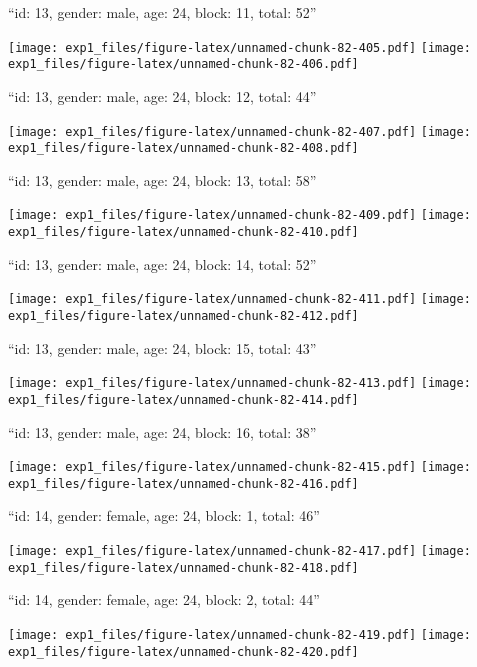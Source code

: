 \documentclass[11pt,,]{article}
\begin{document}
\newpage
[1] 

``id: 13, gender: male, age: 24, block: 11, total: 52''

\texttt{[image: exp1\_files/figure-latex/unnamed-chunk-82-405.pdf]}
\texttt{[image: exp1\_files/figure-latex/unnamed-chunk-82-406.pdf]}

\newpage
[1] 

``id: 13, gender: male, age: 24, block: 12, total: 44''

\texttt{[image: exp1\_files/figure-latex/unnamed-chunk-82-407.pdf]}
\texttt{[image: exp1\_files/figure-latex/unnamed-chunk-82-408.pdf]}

\newpage
[1] 

``id: 13, gender: male, age: 24, block: 13, total: 58''

\texttt{[image: exp1\_files/figure-latex/unnamed-chunk-82-409.pdf]}
\texttt{[image: exp1\_files/figure-latex/unnamed-chunk-82-410.pdf]}

\newpage
[1] 

``id: 13, gender: male, age: 24, block: 14, total: 52''

\texttt{[image: exp1\_files/figure-latex/unnamed-chunk-82-411.pdf]}
\texttt{[image: exp1\_files/figure-latex/unnamed-chunk-82-412.pdf]}

\newpage
[1] 

``id: 13, gender: male, age: 24, block: 15, total: 43''

\texttt{[image: exp1\_files/figure-latex/unnamed-chunk-82-413.pdf]}
\texttt{[image: exp1\_files/figure-latex/unnamed-chunk-82-414.pdf]}

\newpage
[1] 

``id: 13, gender: male, age: 24, block: 16, total: 38''

\texttt{[image: exp1\_files/figure-latex/unnamed-chunk-82-415.pdf]}
\texttt{[image: exp1\_files/figure-latex/unnamed-chunk-82-416.pdf]}

\newpage
[1] 

``id: 14, gender: female, age: 24, block: 1, total: 46''

\texttt{[image: exp1\_files/figure-latex/unnamed-chunk-82-417.pdf]}
\texttt{[image: exp1\_files/figure-latex/unnamed-chunk-82-418.pdf]}

\newpage
[1] 

``id: 14, gender: female, age: 24, block: 2, total: 44''

\texttt{[image: exp1\_files/figure-latex/unnamed-chunk-82-419.pdf]}
\texttt{[image: exp1\_files/figure-latex/unnamed-chunk-82-420.pdf]}
\end{document}
